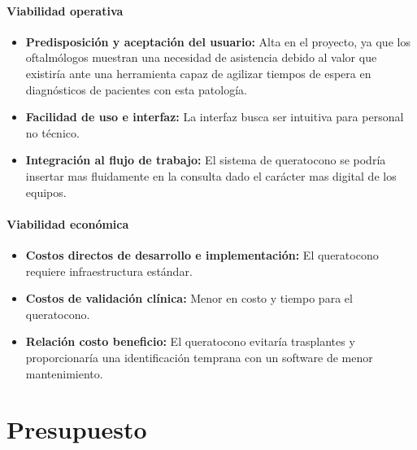             \paragraph{Viabilidad operativa} 
        
            \begin{itemize}
                \item \textbf{Predisposición y aceptación del usuario:} Alta en el proyecto, ya que los oftalmólogos muestran una necesidad de asistencia debido al valor que existiría ante una herramienta capaz de agilizar tiempos de espera en diagnósticos de pacientes con esta patología.
                
                \item \textbf{Facilidad de uso e interfaz:} La interfaz busca ser intuitiva para personal no técnico.
                
                \item \textbf{Integración al flujo de trabajo:} El sistema de queratocono se podría insertar mas fluidamente en la consulta dado el carácter mas digital de los equipos.
            \end{itemize}
        
            \paragraph{Viabilidad económica}
        
            \begin{itemize}
                \item \textbf{Costos directos de desarrollo e implementación:} El queratocono requiere infraestructura estándar.
                
                \item \textbf{Costos de validación clínica:} Menor en costo y tiempo para el queratocono.
                
                \item \textbf{Relación costo beneficio:} El queratocono evitaría trasplantes y proporcionaría una identificación temprana con un software de menor mantenimiento.
            \end{itemize}

    \vspace{-0.5 cm}
    \section{Presupuesto}

